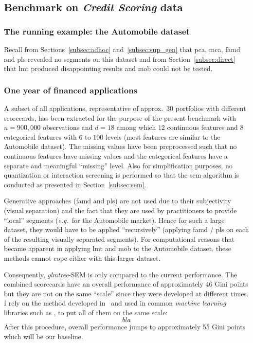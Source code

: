 \subsection{Benchmark on \textit{Credit Scoring} data}

\subsubsection{The running example: the Automobile dataset}

Recall from Sections~\ref{subsec:adhoc} and~\ref{subsec:sup_gen} that \gls{pca}, \gls{mca}, \gls{famd} and \gls{pls} revealed no segments on this dataset and from Section~\ref{subsec:direct} that \gls{lmt} produced disappointing results and \gls{mob} could not be tested.

\subsubsection{One year of financed applications}

A subset of all applications, representative of approx.\ $30$ portfolios with different scorecards, has been extracted for the purpose of the present benchmark with $n = 900{,}000$ observations and $d = 18$ among which $12$ continuous features and $8$ categorical features with $6$ to $100$ levels (most features are similar to the Automobile dataset). The missing values have been preprocessed such that no continuous features have missing values and the categorical features have a separate and meaningful ``missing'' level. Also for simplification purposes, no quantization or interaction screening is performed so that the \gls{sem} algorithm is conducted as presented in Section~\ref{subsec:sem}.

Generative approaches (\gls{famd} and \gls{pls}) are not used due to their subjectivity (visual separation) and the fact that they are used by practitioners to provide ``local'' segments (\textit{e.g.}\ for the Automobile market). Hence for such a large dataset, they would have to be applied ``recursively'' (applying \gls{famd} / \gls{pls} on each of the resulting visually separated segments). For computational reasons that became apparent in applying \gls{lmt} and \gls{mob} to the Automobile dataset, these methods cannot cope either with this larger dataset.

Consequently, \textit{glmtree}-SEM is only compared to the current performance. The combined scorecards have an overall performance of approximately 46 Gini points but they are not on the same ``scale'' since they were developed at different times. I rely on the method developed in~\cite{} and used in common \textit{machine learning} libraries such as , to put all of them on the same scale:
\[ bla \]
After this procedure, overall performance jumps to approximately 55 Gini points which will be our baseline.


